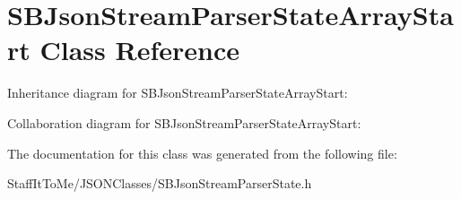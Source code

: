 \hypertarget{interface_s_b_json_stream_parser_state_array_start}{
\section{\-S\-B\-Json\-Stream\-Parser\-State\-Array\-Start \-Class \-Reference}
\label{interface_s_b_json_stream_parser_state_array_start}
}


\-Inheritance diagram for \-S\-B\-Json\-Stream\-Parser\-State\-Array\-Start\-:


\-Collaboration diagram for \-S\-B\-Json\-Stream\-Parser\-State\-Array\-Start\-:


\-The documentation for this class was generated from the following file\-:\begin{DoxyCompactItemize}
\item 
\-Staff\-It\-To\-Me/\-J\-S\-O\-N\-Classes/\-S\-B\-Json\-Stream\-Parser\-State.\-h\end{DoxyCompactItemize}
